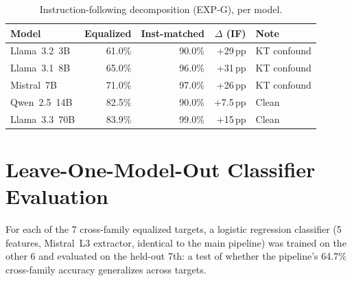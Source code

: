 \begin{table}[h]
\centering
\caption{Instruction-following decomposition (EXP-G), per model.}
\label{tab:expg_summary}
\begin{tabular}{lrrrl}
\toprule
\textbf{Model} & \textbf{Equalized} & \textbf{Inst-matched} & \textbf{$\Delta$ (IF)} & \textbf{Note} \\
\midrule
Llama~3.2~3B  & 61.0\% & 90.0\% & +29\,pp & KT confound \\
Llama~3.1~8B  & 65.0\% & 96.0\% & +31\,pp & KT confound \\
Mistral~7B    & 71.0\% & 97.0\% & +26\,pp & KT confound \\
Qwen~2.5~14B  & 82.5\% & 90.0\% & +7.5\,pp & Clean \\
Llama~3.3~70B & 83.9\% & 99.0\% & +15\,pp & Clean \\
\bottomrule
\end{tabular}
\end{table}

\section{Leave-One-Model-Out Classifier Evaluation}\label{app:loo_across_models}

For each of the 7 cross-family equalized targets, a logistic regression classifier (5 features, Mistral~L3 extractor, identical to the main pipeline) was trained on the other 6 and evaluated on the held-out 7th: a test of whether the pipeline's 64.7\% cross-family accuracy generalizes across targets.

